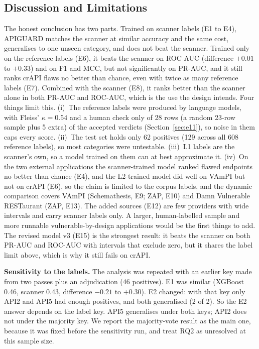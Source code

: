 \documentclass[conference]{IEEEtran}
\begin{document}
\subsection{Discussion and Limitations}
The honest conclusion has two parts. Trained on scanner labels (E1 to E4), APIGUARD matches the scanner at similar accuracy and the same cost, generalises to one
unseen category, and does not beat the scanner. Trained only on the reference labels (E6), it beats the scanner on ROC-AUC (difference $+0.01$ to $+0.33$) and on F1 and MCC, but not
significantly on PR-AUC, and it still ranks crAPI flaws no better than chance, even with twice as many reference labels (E7). Combined with the scanner (E8), it ranks better than the scanner alone in both PR-AUC and ROC-AUC, which is the use the design intends. Four things limit this. (i)~The reference labels were produced by
language models, with Fleiss' $\kappa=0.54$ and a human check only of 28 rows (a random 23-row sample plus 5 extra) of the accepted verdicts (Section~\ref{sec:e11}), so noise in them caps every score. (ii)~The test set holds only 62 positives (129 across all 608 reference labels),
so most categories were untestable. (iii)~L1 labels are the scanner's own, so a model trained on them can at best
approximate it. (iv)~On the two external applications the scanner-trained model ranked flawed endpoints no better than chance (E4), and the L2-trained model did well on VAmPI but not on crAPI (E6), so the claim is limited to the corpus labels, and the dynamic comparison covers VAmPI (Schemathesis, E9; ZAP, E10) and Damn Vulnerable RESTaurant (ZAP, E13). The added sources (E12) are few providers with wide intervals and carry scanner labels only. A larger, human-labelled sample and more runnable vulnerable-by-design applications would be the first things to add. The revised model v3 (E15) is the strongest result: it beats the scanner on both PR-AUC and ROC-AUC with intervals that exclude zero, but it shares the label limit above, which is why it still fails on crAPI.

\textbf{Sensitivity to the labels.} The analysis was repeated with an earlier key made from two passes
plus an adjudication (46 positives). E1 was similar (XGBoost 0.46, scanner 0.43, difference $-0.21$ to $+0.30$).
E2 changed: with that key only API2 and API5 had enough positives, and both generalised (2 of 2).
So the E2 answer depends on the label key. API5 generalises under both keys; API2 does not under the majority key.
We report the majority-vote result as the main one, because it was fixed before the sensitivity run, and
treat RQ2 as unresolved at this sample size.
\end{document}

